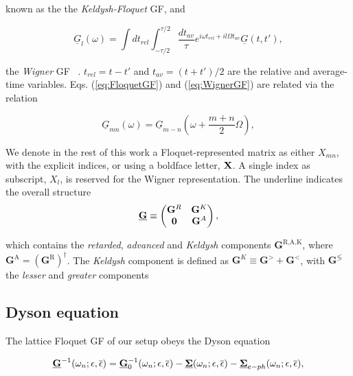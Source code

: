 \documentclass[aps,prb,groupedaddress,showpacs,twocolumn,superscriptaddress,10pt]{revtex4-2}
\begin{document}
known as the the \emph{Keldysh-Floquet} GF, and

\begin{equation}\label{eq:WignerGF}
\underline{G}_{l}(\omega) =\int dt_{rel} \int_{-\tau/2}^{\tau/2} \frac{dt_{av}}{\tau} e^{i\omega t_{rel} + il\Omega t_{av}} \underline{G}(t,t'),
\end{equation}

the \emph{Wigner} GF ~\cite{ts.ok.08}. $t_{rel} = t-t{'}$ and $t_{av} = (t+t{'})/2$ are the relative and average-time variables. Eqs. (\ref{eq:FloquetGF}) and (\ref{eq:WignerGF}) are related via the relation

\begin{equation}\label{eq:Wig2Fl}
\underline{G}_{mn}(\omega)=\underline{G}_{m-n}\left(\omega+\frac{m+n}{2}\Omega \right),
\end{equation}

We denote in the rest of this work a Floquet-represented matrix as either $X_{mn}$, with the explicit indices, or using a boldface letter, $\bf{X}$. A single index as subscript, $X_{l}$, is reserved for the Wigner representation. The underline indicates the overall structure 
\begin{equation}\label{eq:Keld-structure}
\underline{{\bf G}} \equiv 
\begin{pmatrix}
{\bf G}^{R} & {\bf G}^{K}\\
{\bf 0}         & {\bf G}^{A} \\
\end{pmatrix},
\end{equation}

which contains the \emph{retarded}, \emph{advanced} and \emph{Keldysh} components $\textbf{G}^{\text{R,A,K}}$, where $\textbf{G}^{\text{A}}=(\textbf{G}^{\text{R}})^{\dagger}$. The \emph{Keldysh} component is defined as $\textbf{G}^{K} \equiv \textbf{G}^{>} + \textbf{G}^{<}$, with $\textbf{G}^{\lessgtr}$ the \emph{lesser} and \emph{greater} components~\cite{schw.61,keld.65,ra.sm.86,ha.ja}
 
\subsection{Dyson equation}
\label{sec:Dyson_equation}
	 
	 
The lattice Floquet GF of our setup obeys the Dyson equation 

\begin{equation}\label{eq:FullDysonEq}
\underline{{\bf G}}^{-1}(\omega_n;\epsilon,\overline{\epsilon}) = \underline{{\bf G}}^{-1}_{0}(\omega_n;\epsilon,\overline{\epsilon}) - \underline{{\bf \Sigma}}(\omega_n;\epsilon,\overline{\epsilon}) - \underline{{\bf \Sigma}}_{e-ph}(\omega_n;\epsilon,\overline{\epsilon}),
\end{equation}
  
\end{document}
